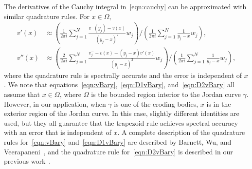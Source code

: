 \documentclass[3p]{elsarticle}
\newcommand{\eeta}{{\boldsymbol\eta}}
\newcommand{\RR}{{\mathbb{R}}}
\renewcommand{\ss}{{\mathbf{s}}}
\newcommand{\xx}{{\mathbf{x}}}
\newcommand{\pderiv}[2]{\frac{\partial #1}{\partial #2}}
\begin{document}
The derivatives of the Cauchy integral in~\eqref{eqn:cauchy} can be
approximated with similar quadrature rules. For $x \in \Omega$, 
\begin{align}
  v'(x) &\approx \left(\frac{1}{2\pi i}\sum_{j=1}^{N}
    \frac{v^{-}(y_j) - v(x)}{(y_j-x)^2} w_j \right)
  \Bigg/
  \left(\frac{1}{2\pi i}\sum_{j=1}^{N} \frac{1}{y_j-x} w_j\right), 
  \label{eqn:D1vBary} \\
  v''(x) &\approx \left(\frac{2}{2\pi i}\sum_{j=1}^N 
    \frac{v^{-}_{j} - v(x) - (y_j-x)v'(x)}{(y_j-x)^3}w_j \right)
    \Bigg/
    \left(\frac{1}{2\pi i}\sum_{j=1}^N \frac{1}{y_j-x}w_j\right),
  \label{eqn:D2vBary}
\end{align}
where the quadrature rule is spectrally accurate and the error is
independent of $x$. We note that
equations~\eqref{eqn:vBary},~\eqref{eqn:D1vBary},
and~\eqref{eqn:D2vBary} all assume that $x \in \Omega$, where $\Omega$
is the bounded region interior to the Jordan curve $\gamma$. However, in
our application, when $\gamma$ is one of the eroding bodies, $x$ is in
the exterior region of the Jordan curve. In this case, slightly
different identities are used, but they all guarantee that the trapezoid
rule achieves spectral accuracy with an error that is independent of
$x$. A complete description of the quadrature rules
for~\eqref{eqn:vBary} and~\eqref{eqn:D1vBary} are described by Barnett,
Wu, and Veerapaneni~\cite{bar-wu-vee2015}, and the quadrature rule
for~\eqref{eqn:D2vBary} is described in our previous
work~\cite{chiu2020viscous}.




%
\end{document}
